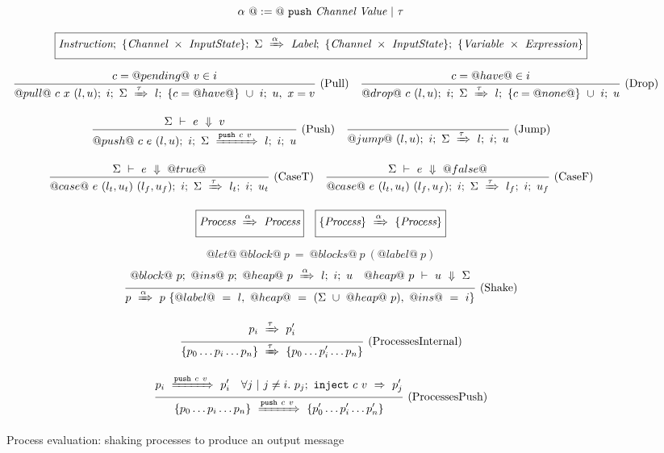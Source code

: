 \begin{figure}

$$
\alpha~@:=@~ \texttt{push}~\textit{Channel}~\textit{Value} ~|~ \tau
$$

$$
  \boxed{
    \textit{Instruction};~\{\textit{Channel} ~\times~ \textit{InputState}\};~\Sigma~\xRightarrow{\alpha}~\textit{Label};~\{\textit{Channel} ~\times~ \textit{InputState}\};~\{\textit{Variable} ~\times~ \textit{Expression}\}
  }
$$


$$
\enskip \frac {\displaystyle 
  c=@pending@~v \in i
} {\displaystyle 
  @pull@~c~x~(l,u);~i;~\Sigma~\xRightarrow{\tau}~l;~\{ c=@have@ \}~\cup~i;~u,~x = v
} \  \mbox{(Pull)} \enskip
\enskip \frac {\displaystyle 
  c=@have@ \in i
} {\displaystyle 
  @drop@~c~(l,u);~i;~\Sigma~\xRightarrow{\tau}~l;~\{ c=@none@ \}~\cup~i;~u
} \  \mbox{(Drop)} \enskip
$$

$$
\enskip \frac {\displaystyle 
  \Sigma~\vdash~e~\Downarrow~v
} {\displaystyle 
  @push@~c~e~(l,u);~i;~\Sigma~\xRightarrow{\texttt{push}~c~v}~l;~i;~u
} \  \mbox{(Push)} \enskip
\enskip \frac {\displaystyle 
} {\displaystyle 
  @jump@~(l,u);~i;~\Sigma~\xRightarrow{\tau}~l;~i;~u
} \  \mbox{(Jump)} \enskip
$$

$$
\enskip \frac {\displaystyle 
  \Sigma~\vdash~e~\Downarrow~@true@
} {\displaystyle 
  @case@~e~(l_t,u_t)~(l_f,u_f);~i;~\Sigma~\xRightarrow{\tau}~l_t;~i;~u_t
} \  \mbox{(CaseT)} \enskip
\enskip \frac {\displaystyle 
  \Sigma~\vdash~e~\Downarrow~@false@
} {\displaystyle 
  @case@~e~(l_t,u_t)~(l_f,u_f);~i;~\Sigma~\xRightarrow{\tau}~l_f;~i;~u_f
} \  \mbox{(CaseF)} \enskip
$$

$$
  \boxed{\textit{Process}~\xRightarrow{\alpha}~\textit{Process}}
  \quad
  \boxed{\{ \textit{Process} \}~\xRightarrow{\alpha}~\{ \textit{Process} \}}
$$

$$
@let@~@block@~p~=~@blocks@~p~(@label@~p)
$$
$$
\enskip \frac {\displaystyle 
  @block@~p;~@ins@~p;~@heap@~p~\xRightarrow{\alpha}~l;~i;~u
  \quad
    @heap@~p~\vdash~u~\Downarrow~\Sigma
} {\displaystyle 
  p~\xRightarrow{\alpha}~p~\{ @label@~=~l,~@heap@~=~(\Sigma~\cup~@heap@~p),~@ins@~=~i \}
} \  \mbox{(Shake)} \enskip
$$




$$
\ruleIN{
  \ProcShake{p_i}{\tau}{p'_i}
}{
  \ProcsShake{
    \sgl{p_0 \ldots p_i \ldots p_n}
  }{\tau}{
    \sgl{p_0 \ldots p'_i \ldots p_n}
  }
}{ProcessesInternal}
$$

$$
\ruleIN{
  \ProcShake{p_i}{\Push~c~v}{p'_i}
  \quad
  \forall j~|~j \neq i.~
  \ProcInject{p_j}{c}{v}{p'_j}
}{
  \ProcsShake{
    \sgl{p_0 \ldots p_i \ldots p_n}
  }{\Push~c~v}{
    \sgl{p'_0 \ldots p'_i \ldots p'_n}
  }
}{ProcessesPush}
$$


\caption{Process evaluation: shaking processes to produce an output message}
\label{fig:Process:Eval:Shake}
\end{figure}

